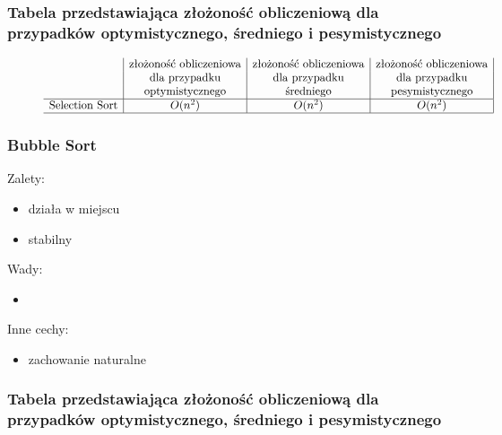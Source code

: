 \documentclass[polish,polish,a4paper]{article}
\begin{document}
\begin{spacing}{1.5}
				\subsubsection*{Tabela przedstawiająca złożoność obliczeniową dla przypadków optymistycznego, średniego i pesymistycznego} 
	\begin{figure}[H]

		\begin{equation*}
		\begin{array}{l|c|c|c|}

		&$złożoność obliczeniowa$&$złożoność obliczeniowa$&$złożoność obliczeniowa$\\
		&$dla przypadku$&$dla przypadku$&$dla przypadku$\\
		&$optymistycznego$&$średniego$&$pesymistycznego$\\
		\hline
		$Selection Sort$&O(n^2)&O(n^2)&O(n^2)\\
		\hline
		\end{array}
		\end{equation*}
	\end{figure}
	
	
			\subsubsection*{Bubble Sort}
	Zalety:
	\begin{itemize}
		\item działa w miejscu
		\item stabilny 
	\end{itemize}
	Wady:
	\begin{itemize}
		\item 
	\end{itemize}
	Inne cechy:
	\begin{itemize}
		\item zachowanie naturalne
	\end{itemize}
	
	
	\subsubsection*{Tabela przedstawiająca złożoność obliczeniową dla przypadków optymistycznego, średniego i pesymistycznego} 
	
	\begin{figure}[H]
			\begin{equation*}
		\begin{array}{l|c|c|c|}


\end{array}
\end{equation*}
\end{figure}
\end{spacing}
\end{document}

